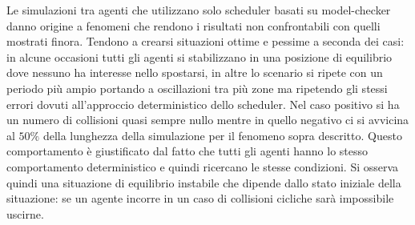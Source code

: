 Le simulazioni tra agenti che utilizzano solo scheduler basati su model-checker danno origine a fenomeni che rendono i risultati non confrontabili con quelli mostrati finora. Tendono a crearsi situazioni ottime e pessime a seconda dei casi: in alcune occasioni tutti gli agenti si stabilizzano in una posizione di equilibrio dove nessuno ha interesse nello spostarsi, in altre lo scenario si ripete con un periodo più ampio portando a oscillazioni tra più zone ma ripetendo gli stessi errori dovuti all'approccio deterministico dello scheduler. Nel caso positivo si ha un numero di collisioni quasi sempre nullo mentre in quello negativo ci si avvicina al $50\%$ della lunghezza della simulazione per il fenomeno sopra descritto. Questo comportamento è giustificato dal fatto che tutti gli agenti hanno lo stesso comportamento deterministico e quindi ricercano le stesse condizioni. Si osserva quindi una situazione di equilibrio instabile che dipende dallo stato iniziale della situazione: se un agente incorre in un caso di collisioni cicliche sarà impossibile uscirne.